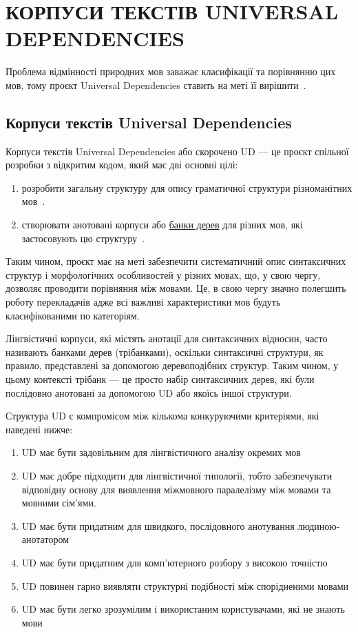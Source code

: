 \section{КОРПУСИ ТЕКСТІВ UNIVERSAL DEPENDENCIES}

Проблема відмінності природних мов заважає класифікації та порівнянню цих мов,
тому проєкт Universal Dependencies ставить на меті її вирішити~\cite{bib18}.

\subsection{Корпуси текстів Universal Dependencies}
Корпуси текстів Universal Dependencies або скорочено UD — це проєкт
спільної розробки з відкритим кодом, який має дві основні цілі:

\begin{enumerate}
    \item розробити загальну структуру для опису граматичної структури
    різноманітних мов~\cite{bib1}.
    \item створювати анотовані корпуси або \hyperlink{term0}{банки дерев} для
    різних мов,
    які застосовують цю структуру~\cite{bib2}.
\end{enumerate}

Таким чином, проєкт має на меті забезпечити систематичний опис синтаксичних структур і
морфологічних особливостей у різних мовах, що, у свою чергу, дозволяє проводити порівняння
між мовами. Це, в свою чергу значно полегшить роботу перекладачів
адже всі важливі характеристики мов будуть класифікованими по категоріям.

Лінгвістичні корпуси, які містять анотації для синтаксичних відносин,
часто називають банками дерев (трібанками), оскільки синтаксичні структури, як правило,
представлені за допомогою деревоподібних структур. Таким чином, у цьому контексті трібанк —
це просто набір синтаксичних дерев, які були послідовно анотовані за допомогою UD
або якоїсь іншої структури.

Структура UD є компромісом між кількома конкуруючими критеріями, які наведені нижче:

\begin{enumerate}
    \item UD має бути задовільним для лінгвістичного аналізу окремих мов
    \item UD має добре підходити для лінгвістичної типології, тобто 
    забезпечувати відповідну основу для виявлення міжмовного паралелізму між
    мовами та мовними сім’ями.
    \item UD має бути придатним для швидкого, послідовного анотування людиною-анотатором
    \item UD має бути придатним для комп'ютерного розбору з високою точністю
    \item UD повинен гарно виявляти структурні подібності між спорідненими мовами
    \item UD має бути легко зрозумілим і використаним користувачами, які не знають мови
\end{enumerate}

